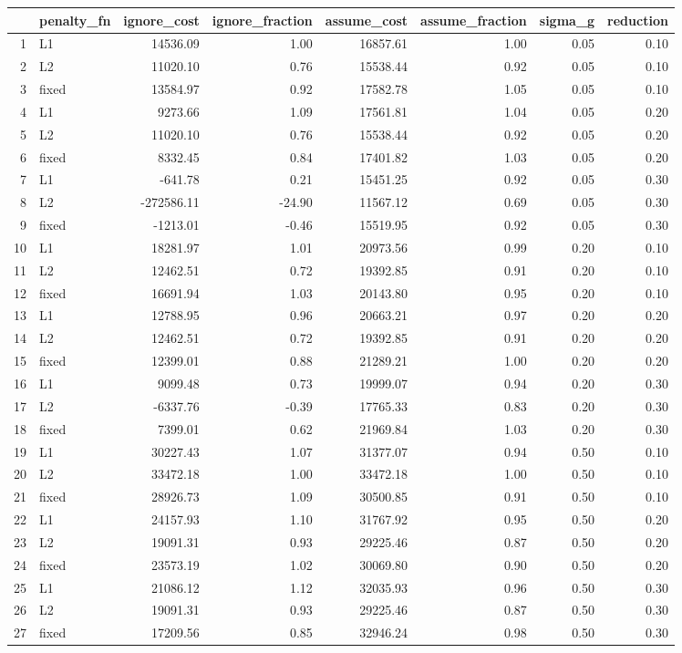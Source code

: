 \documentclass{article}\usepackage{graphicx, color}
\begin{document}
\begin{table}[ht]
\centering
\begin{tabular}{rlrrrrrr}
  \hline
 & penalty\_fn & ignore\_cost & ignore\_fraction & assume\_cost & assume\_fraction & sigma\_g & reduction \\ 
  \hline
1 & L1 & 14536.09 & 1.00 & 16857.61 & 1.00 & 0.05 & 0.10 \\ 
  2 & L2 & 11020.10 & 0.76 & 15538.44 & 0.92 & 0.05 & 0.10 \\ 
  3 & fixed & 13584.97 & 0.92 & 17582.78 & 1.05 & 0.05 & 0.10 \\ 
  4 & L1 & 9273.66 & 1.09 & 17561.81 & 1.04 & 0.05 & 0.20 \\ 
  5 & L2 & 11020.10 & 0.76 & 15538.44 & 0.92 & 0.05 & 0.20 \\ 
  6 & fixed & 8332.45 & 0.84 & 17401.82 & 1.03 & 0.05 & 0.20 \\ 
  7 & L1 & -641.78 & 0.21 & 15451.25 & 0.92 & 0.05 & 0.30 \\ 
  8 & L2 & -272586.11 & -24.90 & 11567.12 & 0.69 & 0.05 & 0.30 \\ 
  9 & fixed & -1213.01 & -0.46 & 15519.95 & 0.92 & 0.05 & 0.30 \\ 
  10 & L1 & 18281.97 & 1.01 & 20973.56 & 0.99 & 0.20 & 0.10 \\ 
  11 & L2 & 12462.51 & 0.72 & 19392.85 & 0.91 & 0.20 & 0.10 \\ 
  12 & fixed & 16691.94 & 1.03 & 20143.80 & 0.95 & 0.20 & 0.10 \\ 
  13 & L1 & 12788.95 & 0.96 & 20663.21 & 0.97 & 0.20 & 0.20 \\ 
  14 & L2 & 12462.51 & 0.72 & 19392.85 & 0.91 & 0.20 & 0.20 \\ 
  15 & fixed & 12399.01 & 0.88 & 21289.21 & 1.00 & 0.20 & 0.20 \\ 
  16 & L1 & 9099.48 & 0.73 & 19999.07 & 0.94 & 0.20 & 0.30 \\ 
  17 & L2 & -6337.76 & -0.39 & 17765.33 & 0.83 & 0.20 & 0.30 \\ 
  18 & fixed & 7399.01 & 0.62 & 21969.84 & 1.03 & 0.20 & 0.30 \\ 
  19 & L1 & 30227.43 & 1.07 & 31377.07 & 0.94 & 0.50 & 0.10 \\ 
  20 & L2 & 33472.18 & 1.00 & 33472.18 & 1.00 & 0.50 & 0.10 \\ 
  21 & fixed & 28926.73 & 1.09 & 30500.85 & 0.91 & 0.50 & 0.10 \\ 
  22 & L1 & 24157.93 & 1.10 & 31767.92 & 0.95 & 0.50 & 0.20 \\ 
  23 & L2 & 19091.31 & 0.93 & 29225.46 & 0.87 & 0.50 & 0.20 \\ 
  24 & fixed & 23573.19 & 1.02 & 30069.80 & 0.90 & 0.50 & 0.20 \\ 
  25 & L1 & 21086.12 & 1.12 & 32035.93 & 0.96 & 0.50 & 0.30 \\ 
  26 & L2 & 19091.31 & 0.93 & 29225.46 & 0.87 & 0.50 & 0.30 \\ 
  27 & fixed & 17209.56 & 0.85 & 32946.24 & 0.98 & 0.50 & 0.30 \\ 
   \hline
\end{tabular}



\end{table}
\end{document}

